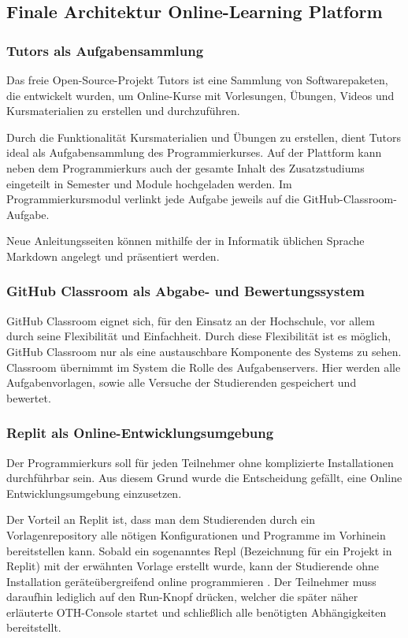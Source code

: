 \subsection{Finale Architektur Online-Learning Platform}
\subsubsection{Tutors als Aufgabensammlung}
Das freie Open-Source-Projekt Tutors ist eine Sammlung von Softwarepaketen,
die entwickelt wurden, um Online-Kurse mit Vorlesungen, Übungen, Videos und
Kursmaterialien zu erstellen und durchzuführen. \parencite{tutors}

Durch die Funktionalität Kursmaterialien und Übungen zu erstellen, dient Tutors
ideal als Aufgabensammlung des Programmierkurses. Auf der Plattform kann neben
dem Programmierkurs auch der gesamte Inhalt des Zusatzstudiums eingeteilt in
Semester und Module hochgeladen werden. Im Programmierkursmodul verlinkt jede 
Aufgabe jeweils auf die GitHub-Classroom-Aufgabe.

Neue Anleitungsseiten können mithilfe der in Informatik üblichen
Sprache Markdown angelegt und präsentiert werden.

\subsubsection{GitHub Classroom als Abgabe- und Bewertungssystem}
GitHub Classroom eignet sich, für den Einsatz an der Hochschule, vor allem durch
seine Flexibilität und Einfachheit. Durch diese Flexibilität ist es möglich,
GitHub Classroom nur als eine austauschbare Komponente des Systems zu sehen.
Classroom übernimmt im System die Rolle des Aufgabenservers. Hier werden alle
Aufgabenvorlagen, sowie alle Versuche der Studierenden gespeichert und bewertet.

\subsubsection{Replit als Online-Entwicklungsumgebung}
Der Programmierkurs soll für jeden Teilnehmer ohne komplizierte Installationen
durchführbar sein. Aus diesem Grund wurde die Entscheidung gefällt, eine
Online Entwicklungsumgebung einzusetzen.

Der Vorteil an Replit ist, dass man dem Studierenden durch ein
Vorlagenrepository alle nötigen Konfigurationen und Programme im Vorhinein
bereitstellen kann. Sobald ein sogenanntes \glqq Repl\grqq{} (Bezeichnung für
ein Projekt in Replit) mit der erwähnten Vorlage erstellt wurde, kann der
Studierende ohne Installation geräteübergreifend online programmieren
\parencite{replit-import-from-github}. Der Teilnehmer muss daraufhin lediglich auf
den \glqq Run\grqq{}-Knopf drücken, welcher die später näher erläuterte
\glqq OTH-Console\grqq{} startet und schließlich alle benötigten Abhängigkeiten bereitstellt.